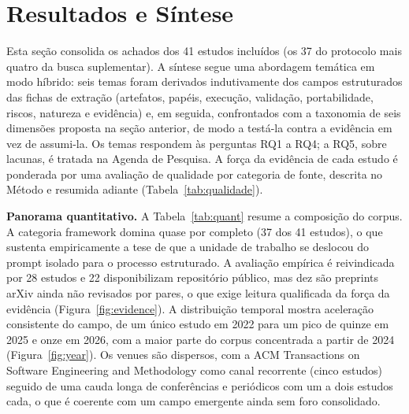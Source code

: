 \section{Resultados e Síntese}

Esta seção consolida os achados dos 41 estudos incluídos (os 37 do protocolo mais quatro da busca suplementar). A síntese segue uma abordagem temática em modo híbrido: seis temas foram derivados indutivamente dos campos estruturados das fichas de extração (artefatos, papéis, execução, validação, portabilidade, riscos, natureza e evidência) e, em seguida, confrontados com a taxonomia de seis dimensões proposta na seção anterior, de modo a testá-la contra a evidência em vez de assumi-la. Os temas respondem às perguntas RQ1 a RQ4; a RQ5, sobre lacunas, é tratada na Agenda de Pesquisa. A força da evidência de cada estudo é ponderada por uma avaliação de qualidade por categoria de fonte, descrita no Método e resumida adiante (Tabela~\ref{tab:qualidade}).

\noindent\textbf{Panorama quantitativo.} A Tabela~\ref{tab:quant} resume a composição do corpus. A categoria framework domina quase por completo (37 dos 41 estudos), o que sustenta empiricamente a tese de que a unidade de trabalho se deslocou do prompt isolado para o processo estruturado. A avaliação empírica é reivindicada por 28 estudos e 22 disponibilizam repositório público, mas dez são preprints arXiv ainda não revisados por pares, o que exige leitura qualificada da força da evidência (Figura~\ref{fig:evidence}). A distribuição temporal mostra aceleração consistente do campo, de um único estudo em 2022 para um pico de quinze em 2025 e onze em 2026, com a maior parte do corpus concentrada a partir de 2024 (Figura~\ref{fig:year}). Os venues são dispersos, com a ACM Transactions on Software Engineering and Methodology como canal recorrente (cinco estudos) seguido de uma cauda longa de conferências e periódicos com um a dois estudos cada, o que é coerente com um campo emergente ainda sem foro consolidado.

